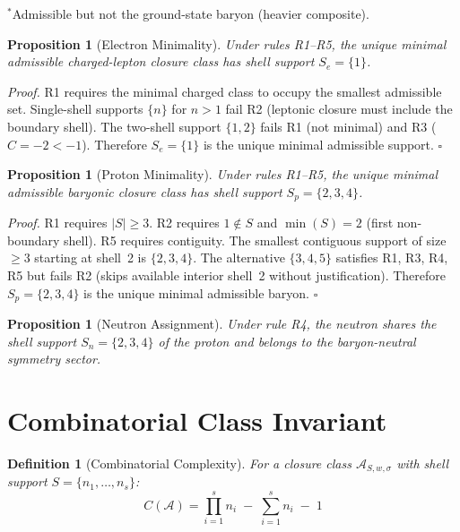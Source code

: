 \documentclass[12pt]{article}
\newtheorem{proposition}[theorem]{Proposition}
\newtheorem{definition}[theorem]{Definition}
\newcommand{\Acal}{\mathcal{A}}
\begin{document}
\noindent $^*$Admissible but not the ground-state baryon (heavier composite).

\begin{proposition}[Electron Minimality]\label{prop:electron}
Under rules R1--R5, the unique minimal admissible charged-lepton closure class has shell support $S_e = \{1\}$.
\end{proposition}

\textit{Proof.} R1 requires the minimal charged class to occupy the smallest admissible set. Single-shell supports $\{n\}$ for $n > 1$ fail R2 (leptonic closure must include the boundary shell). The two-shell support $\{1,2\}$ fails R1 (not minimal) and R3 ($C = -2 < -1$). Therefore $S_e = \{1\}$ is the unique minimal admissible support. $\square$

\begin{proposition}[Proton Minimality]\label{prop:proton}
Under rules R1--R5, the unique minimal admissible baryonic closure class has shell support $S_p = \{2,3,4\}$.
\end{proposition}

\textit{Proof.} R1 requires $|S| \geq 3$. R2 requires $1 \notin S$ and $\min(S) = 2$ (first non-boundary shell). R5 requires contiguity. The smallest contiguous support of size $\geq 3$ starting at shell~2 is $\{2,3,4\}$. The alternative $\{3,4,5\}$ satisfies R1, R3, R4, R5 but fails R2 (skips available interior shell~2 without justification). Therefore $S_p = \{2,3,4\}$ is the unique minimal admissible baryon. $\square$

\begin{proposition}[Neutron Assignment]\label{prop:neutron}
Under rule R4, the neutron shares the shell support $S_n = \{2,3,4\}$ of the proton and belongs to the baryon-neutral symmetry sector.
\end{proposition}

\section{Combinatorial Class Invariant}\label{sec:invariant}

\begin{definition}[Combinatorial Complexity]\label{def:C}
For a closure class $\Acal_{S,w,\sigma}$ with shell support $S = \{n_1, \ldots, n_s\}$:
\begin{equation}\label{eq:C}
    C(\Acal) = \prod_{i=1}^{s} n_i \;-\; \sum_{i=1}^{s} n_i \;-\; 1
\end{equation}
\end{definition}
\end{document}
